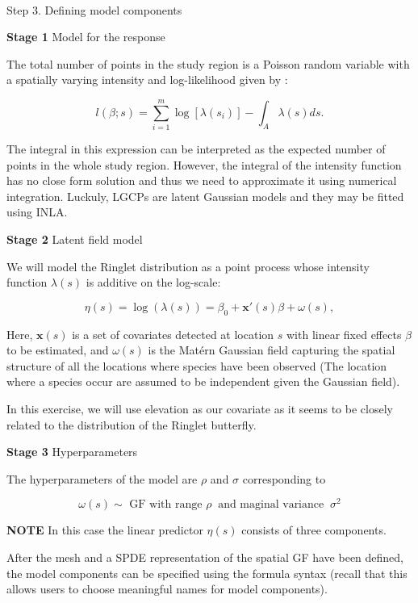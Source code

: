 \documentclass[
  letterpaper,
  DIV=11,
  numbers=noendperiod]{scrartcl}
\makeatletter
\let\oldparagraph\paragraph
\renewcommand{\paragraph}{
    \@ifstar
      \xxxParagraphStar
      \xxxParagraphNoStar
  }
\newcommand{\xxxParagraphStar}[1]{\oldparagraph*{#1}\mbox{}}
\newcommand{\xxxParagraphNoStar}[1]{\oldparagraph{#1}\mbox{}}
\makeatother
\begin{document}
\paragraph{Step 3. Defining model
components}\label{step-3.-defining-model-components}

\textbf{Stage 1} Model for the response

The total number of points in the study region is a Poisson random
variable with a spatially varying intensity and log-likelihood given by
:

\[
l(\beta;s) = \sum_{i=1}^m \log [\lambda(s_i)] - \int_A \lambda(s)ds.
\]

The integral in this expression can be interpreted as the expected
number of points in the whole study region. However, the integral of the
intensity function has no close form solution and thus we need to
approximate it using numerical integration. Luckuly, LGCPs are latent
Gaussian models and they may be fitted using INLA.

\textbf{Stage 2} Latent field model

We will model the Ringlet distribution as a point process whose
intensity function \(\lambda(s)\) is additive on the log-scale:

\[
\eta(s) = \log (\lambda(s))= \beta_0 +  \mathbf{x}'(s)\beta + \omega(s),
\]

Here, \(\mathbf{x}(s)\) is a set of covariates detected at location
\(s\) with linear fixed effects \(\beta\) to be estimated, and
\(\omega(s)\) is the Matérn Gaussian field capturing the spatial
structure of all the locations where species have been observed (The
location where a species occur are assumed to be independent given the
Gaussian field).

In this exercise, we will use elevation as our covariate as it seems to
be closely related to the distribution of the Ringlet butterfly.

\textbf{Stage 3} Hyperparameters

The hyperparameters of the model are \(\rho\) and \(\sigma\)
corresponding to

\[
\omega(s)\sim \text{  GF with range } \rho\  \text{ and maginal variance }\ \sigma^2
\]

\textbf{NOTE} In this case the linear predictor \(\eta(s)\) consists of
three components.

After the mesh and a SPDE representation of the spatial GF have been
defined, the model components can be specified using the formula syntax
(recall that this allows users to choose meaningful names for model
components).
\end{document}
